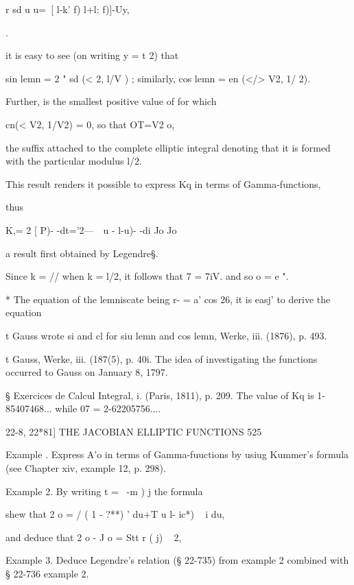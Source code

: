 r sd u 
u=\ [ l-k' f) l+l: f)]-Uy, 

. 

it is easy to see (on writing y = t \/2) that 

sin lemn   = 2 "   sd (<  \/2, l/V ) ; 
similarly, cos lemn   = en (</> V2, 1/ 2). 

Further,   is the smallest positive value of for which 

cn(< V2, 1/V2) = 0, 
so that OT=V2 o, 

the suffix attached to the complete elliptic integral denoting that it is 
formed with the particular modulus l/\/2. 

This result renders it possible to express Kq in terms of Gamma-functions, 



thus 



K,= 2 [    P)- -dt='2---\ \   u -  l-u)- -di 
Jo Jo 



a result first obtained by Legendre§. 

Since k = // when k = l/\/2, it follows that 7  = 7iV. and so  o = e ". 

* The equation of the lemniscate being r- = a'  cos 26, it is easj' to derive the equation 


t Gauss wrote si and cl for siu lemn and cos lemn, Werke, iii. (1876), p. 493. 

t Gauss, Werke, iii. (187(5), p. 40i. The idea of investigating the functions occurred to Gauss 
on January 8, 1797. 

§ Exercices de Calcul Integral, i. (Paris, 1811), p. 209. The value of Kq is 1-85407468... 
while 07 = 2-62205756.... 



22-8, 22*81] THE JACOBIAN ELLIPTIC FUNCTIONS 525 

Example .  Express A'o in terms of Gamma-fuuctions by usiug Kummer's formula 
(see Chapter xiv, example 12, p. 298). 

Example 2. By writing t =  \ -m )  j  the formula 

shew that 2 o = / ( 1 - ?**) ' du+T u  l- ic*) ~ i du, 

and deduce that 2 o - J o = Stt   r ( j)  ~ 2, 

Example 3. Deduce Legendre's relation (§ 22-735) from example 2 combined with 
§ 22-736 example 2. 

